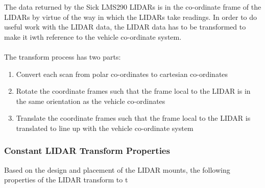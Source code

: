 The data returned by the Sick LMS290 LIDARs is in the co-ordinate frame of the LIDARs by virtue of the way in which the LIDARs take readings. In order to do useful work with the LIDAR data, the LIDAR data has to be transformed to make it iwth reference to the vehicle co-ordinate system. \\ \\
%
\noindent The transform process has two parts:

\begin{enumerate}
\item Convert each scan from polar co-ordinates to cartesian co-ordinates
\item Rotate the coordinate frames such that the frame local to the LIDAR is in the same orientation as the vehicle co-ordinates
\item Translate the coordinate frames such that the frame local to the LIDAR is translated to line up with the vehicle co-ordinate system
\end{enumerate}

\subsubsection{Constant LIDAR Transform Properties}
Based on the design and placement of the LIDAR mounts, the following properties of the LIDAR transform to t